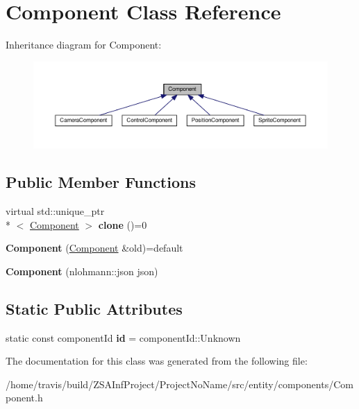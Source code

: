 \hypertarget{classComponent}{\section{Component Class Reference}
\label{classComponent}
}


Inheritance diagram for Component\-:
\nopagebreak
\begin{figure}[H]
\begin{center}
\leavevmode
\includegraphics[width=350pt]{classComponent__inherit__graph}
\end{center}
\end{figure}
\subsection*{Public Member Functions}
\begin{DoxyCompactItemize}
\item 
\hypertarget{classComponent_ab2be3d9a939ca73fa91d466be943fe69}{virtual std\-::unique\-\_\-ptr\\*
$<$ \hyperlink{classComponent}{Component} $>$ {\bfseries clone} ()=0}\label{classComponent_ab2be3d9a939ca73fa91d466be943fe69}

\item 
\hypertarget{classComponent_a61a9c995bc0584eb210cf313107204c1}{{\bfseries Component} (\hyperlink{classComponent}{Component} \&old)=default}\label{classComponent_a61a9c995bc0584eb210cf313107204c1}

\item 
\hypertarget{classComponent_a7597fcf89c237b2cf5f584733c7b20d4}{{\bfseries Component} (nlohmann\-::json json)}\label{classComponent_a7597fcf89c237b2cf5f584733c7b20d4}

\end{DoxyCompactItemize}
\subsection*{Static Public Attributes}
\begin{DoxyCompactItemize}
\item 
\hypertarget{classComponent_af71ada3794f6d5a45c2c0823bd6a5cd0}{static const component\-Id {\bfseries id} = component\-Id\-::\-Unknown}\label{classComponent_af71ada3794f6d5a45c2c0823bd6a5cd0}

\end{DoxyCompactItemize}


The documentation for this class was generated from the following file\-:\begin{DoxyCompactItemize}
\item 
/home/travis/build/\-Z\-S\-A\-Inf\-Project/\-Project\-No\-Name/src/entity/components/Component.\-h\end{DoxyCompactItemize}
